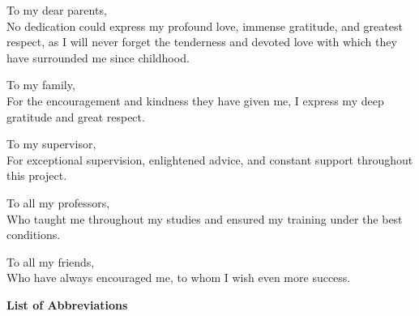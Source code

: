 \documentclass[12pt,a4paper]{report}
\begin{document}
To my dear parents,\\
No dedication could express my profound love, immense gratitude, and greatest respect, as I will never forget the tenderness and devoted love with which they have surrounded me since childhood.

To my family,\\
For the encouragement and kindness they have given me, I express my deep gratitude and great respect.

To my supervisor,\\
For exceptional supervision, enlightened advice, and constant support throughout this project.

To all my professors,\\
Who taught me throughout my studies and ensured my training under the best conditions.

To all my friends,\\
Who have always encouraged me, to whom I wish even more success.

\newpage
\tableofcontents

\newpage
\listoffigures

\newpage
\listoftables

\newpage
\begin{center}
{\Large\bfseries List of Abbreviations}
\end{center}
\vspace{0.5cm}
\end{document}
